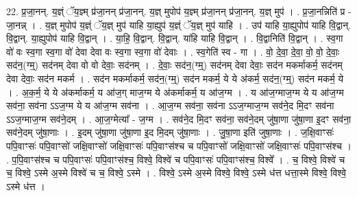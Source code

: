 \documentclass[17pt]{extarticle}
\begin{document}
22. प्र॒जा॒नन्. य॒ज्ञ्ं ॅय॒ज्ञ्म् प्र॑जा॒नन् प्र॑जा॒नन्. य॒ज्ञ् मुपोप॑ य॒ज्ञ्म् प्र॑जा॒नन् प्र॑जा॒नन्. य॒ज्ञ् मुप॑ । . प्र॒जा॒नन्निति॑ प्र - जा॒नन्न् । . य॒ज्ञ् मुपोप॑ य॒ज्ञ्ं ॅय॒ज्ञ् मुप॑ याहि या॒ह्युप॑ य॒ज्ञ्ं ॅय॒ज्ञ् मुप॑ याहि । . उप॑ याहि या॒ह्युपोप॑ याहि वि॒द्वान्. वि॒द्वान्. या॒ह्युपोप॑ याहि वि॒द्वान् । . या॒हि॒ वि॒द्वान्. वि॒द्वान्. या॑हि याहि वि॒द्वान् । . वि॒द्वानिति॑ वि॒द्वान् । . स्व॒गा वो॑ वः स्व॒गा स्व॒गा वो॑ देवा देवा वः स्व॒गा स्व॒गा वो॑ देवाः । . स्व॒गेति॑ स्व - गा । . वो॒ दे॒वा॒ दे॒वा॒ वो॒ वो॒ दे॒वाः॒ सद॑न॒(ग्म्॒) सद॑नम् देवा वो वो देवाः॒ सद॑नम् । . दे॒वाः॒ सद॑न॒(ग्म्॒) सद॑नम् देवा देवाः॒ सद॑न मकर्माकर्म॒ सद॑नम् देवा देवाः॒ सद॑न मकर्म । . सद॑न मकर्माकर्म॒ सद॑न॒(ग्म्॒) सद॑न मकर्म॒ ये ये अ॑कर्म॒ सद॑न॒(ग्म्॒) सद॑न मकर्म॒ ये । . अ॒क॒र्म॒ ये ये अ॑कर्माकर्म॒ य आ॑ज॒ग् माज॒ग्म ये अ॑कर्माकर्म॒ य आ॑ज॒ग्म । . य आ॑ज॒ग्माज॒ग्म ये य आ॑ज॒ग्म सव॑ना॒ सव॑ना ऽऽज॒ग्म ये य आ॑ज॒ग्म सव॑ना । . आ॒ज॒ग्म सव॑ना॒ सव॑ना ऽऽज॒ग्माज॒ग्म सव॑ने॒द मि॒दꣳ सव॑ना ऽऽज॒ग्माज॒ग्म सव॑ने॒दम् । . आ॒ज॒ग्मेत्या᳚ - ज॒ग्म । . सव॑ने॒द मि॒दꣳ सव॑ना॒ सव॑ने॒दम् जु॑षा॒णा जु॑षा॒णा इ॒दꣳ सव॑ना॒ सव॑ने॒दम् जु॑षा॒णाः । . इ॒दम् जु॑षा॒णा जु॑षा॒णा इ॒द मि॒दम् जु॑षा॒णाः । . जु॒षा॒णा इति॑ जुषा॒णाः । . ज॒क्षि॒वाꣳसः॑ पपि॒वाꣳसः॑ पपि॒वाꣳसो॑ जक्षि॒वाꣳसो॑ जक्षि॒वाꣳसः॑ पपि॒वाꣳस॑श्च च पपि॒वाꣳसो॑ जक्षि॒वाꣳसो॑ जक्षि॒वाꣳसः॑ पपि॒वाꣳस॑श्च । . प॒पि॒वाꣳस॑श्च च पपि॒वाꣳसः॑ पपि॒वाꣳस॑श्च॒ विश्वे॒ विश्वे॑ च पपि॒वाꣳसः॑ पपि॒वाꣳस॑श्च॒ विश्वे᳚ । . च॒ विश्वे॒ विश्वे॑ च च॒ विश्वे॒ ऽस्मे अ॒स्मे विश्वे॑ च च॒ विश्वे॒ ऽस्मे । . विश्वे॒ ऽस्मे अ॒स्मे विश्वे॒ विश्वे॒ ऽस्मे ध॑त्त धत्ता॒स्मे विश्वे॒ विश्वे॒ ऽस्मे ध॑त्त । \newline
\end{document}
